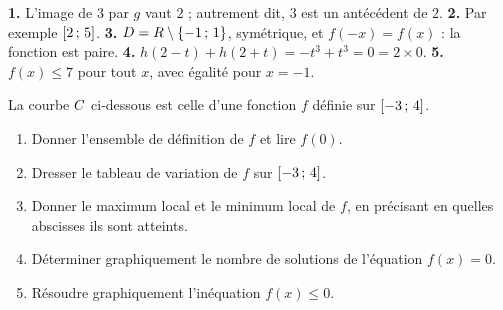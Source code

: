 \begin{corrige}[je me teste]
\textbf{1.} L'image de $3$ par $g$ vaut $2$ ; autrement dit, $3$ est un
antécédent de $2$.
\textbf{2.} Par exemple $\left[2\,;\,5\right]$.
\textbf{3.} $D = R\setminus\{-1\,;\,1\}$, symétrique, et
$f(-x) = f(x)$ : la fonction est paire.
\textbf{4.} $h(2-t)+h(2+t) = -t^{3}+t^{3} = 0 = 2\times0$.
\textbf{5.} $f(x) \leq 7$ pour tout $x$, avec égalité pour $x = -1$.
\end{corrige}

\begin{commeaubac}
La courbe $C$ ci-dessous est celle d'une fonction $f$ définie sur
$\left[-3\,;\,4\right]$.

\begin{center}
\end{center}

\begin{enumerate}[label=\textbf{\arabic*.}, leftmargin=*, itemsep=0.25em]
  \item Donner l'ensemble de définition de $f$ et lire $f(0)$.
  \item Dresser le tableau de variation de $f$ sur $\left[-3\,;\,4\right]$.
  \item Donner le maximum local et le minimum local de $f$, en précisant en
        quelles abscisses ils sont atteints. \bareme{1 pt}
  \item Déterminer graphiquement le nombre de solutions de l'équation
        $f(x) = 0$. \bareme{1 pt}
  \item Résoudre graphiquement l'inéquation $f(x) \leq 0$. \bareme{1 pt}
\end{enumerate}
\end{commeaubac}

